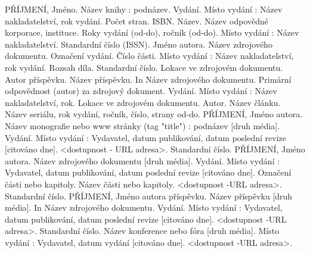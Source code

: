 \documentclass[]{fim-uhk-thesis}
\begin{document}
  \begin{thebibliography}{1}
  PŘÍJMENÍ, Jméno. Název knihy : podnázev. Vydání. Místo vydání : Název nakladatelství, rok vydání. Počet stran. ISBN.
  Název. Název odpovědné korporace, instituce. Roky vydání (od-do), ročník (od-do). Místo vydání : Název nakladatelství. Standardní číslo (ISSN).
  Jméno autora. Název zdrojového dokumentu. Označení vydání. Číslo části. Místo vydání : Název nakladatelství, rok vydání. Rozsah díla. Standardní číslo. Lokace ve zdrojovém dokumentu.
  Autor příspěvku. Název příspěvku. In Název zdrojového dokumentu. Primární odpovědnost (autor) za zdrojový dokument. Vydání. Místo vydání : Název nakladatelství, rok. Lokace ve zdrojovém dokumentu.
  Autor. Název článku. Název seriálu, rok vydání, ročník, číslo, strany od-do.
  PŘÍJMENÍ, Jméno autora. Název monografie nebo www stránky (tag "title") : podnázev [druh média]. Vydání. Místo vydání : Vydavatel, datum publikování, datum poslední revize [citováno dne]. <dostupnost - URL adresa>. Standardní číslo.
  PŘÍJMENÍ, Jméno autora. Název zdrojového dokumentu [druh média]. Vydání. Místo vydání : Vydavatel, datum publikování, datum poslední revize [citováno dne]. Označení části nebo kapitoly. Název části nebo kapitoly. <dostupnost -URL adresa>. Standardní číslo.
  PŘÍJMENÍ, Jméno autora příspěvku. Název příspěvku [druh média]. In Název zdrojového dokumentu. Vydání. Místo vydání : Vydavatel, datum publikování, datum poslední revize [citováno dne]. <dostupnost -URL adresa>. Standardní číslo.
  Název konference nebo fóra [druh média]. Místo vydání : Vydavatel, datum vydání [citováno dne]. <dostupnost -URL adresa>.
  \end{thebibliography}


  
  \newpage

  \iftwoside
    \cleardoublepage
  \fi


  \ifczech
    \renewcommand{\appendixpagename}{Přílohy}
    \renewcommand{\appendixtocname}{Přílohy}
    \renewcommand{\appendixname}{Příloha}
  \fi
  \ifslovak
    \renewcommand{\appendixpagename}{Prílohy}
    \renewcommand{\appendixtocname}{Prílohy}
    \renewcommand{\appendixname}{Príloha}
  \fi
 
  
  
  
  
\end{document}
